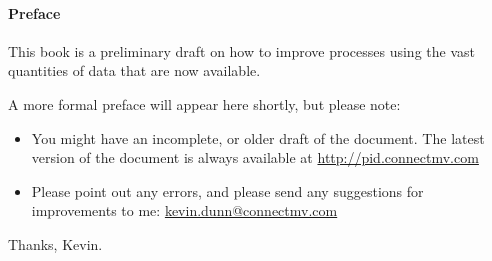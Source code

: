 \paragraph{Preface}





This book is a preliminary draft on how to improve processes using the vast quantities of data that are now available. 

A more formal preface will appear here shortly, but please note:
\begin{itemize}
	\item You might have an incomplete, or older draft of the document.  The latest version of the document is always available at \href{http://pid.connectmv.com}{http://pid.connectmv.com}
	\item Please point out any errors, and please send any suggestions for improvements to me: \href{mailto:kevin.dunn@connectmv.com}{kevin.dunn@connectmv.com}	
\end{itemize}

Thanks, Kevin.



